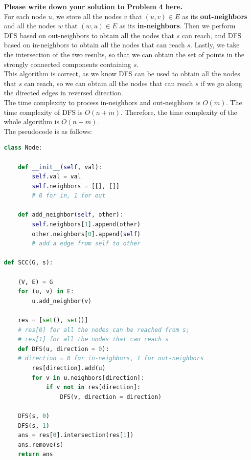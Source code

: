 \documentclass[11pt,twoside]{article}
\newenvironment{solution}{{\par\noindent\it Solution.}}{}
\begin{document}
\begin{solution}
\textbf{Please write down your solution to Problem 4 here.}
\vspace{10pt}\\
For each node $u$, we store all the nodes $v$ that $(u,v)\in E$ as its \textbf{out-neighbors} and all the nodes $w$ that $(w,u)\in E$ as its \textbf{in-neighbors}.
Then we perform DFS based on out-neighbors to obtain all the nodes that $s$ can reach, and DFS based on in-neighbors to obtain all the nodes that can reach $s$.
Lastly, we take the intersection of the two results, so that we can obtain the set of points in the strongly connected components containing $s$.
\vspace{10pt}\\
This algorithm is correct, as we know DFS can be used to obtain all the nodes that $s$ can reach,
so we can obtain all the nodes that can reach $s$ if we go along the directed edges in reversed direction. 
\vspace{10pt}\\
The time complexity to process in-neighbors and out-neighbors is $O(m)$. The time complexity of DFS is $O(n+m)$. Therefore, the time complexity of the whole algorithm is $O(n+m)$.
\vspace{10pt}\\
The pseudocode is as follows:
\begin{lstlisting}[language=Python]
class Node:

    def __init__(self, val):
        self.val = val
        self.neighbors = [[], []]
        # 0 for in, 1 for out

    def add_neighbor(self, other):
        self.neighbors[1].append(other)
        other.neighbors[0].append(self)
        # add a edge from self to other

def SCC(G, s):

    (V, E) = G
    for (u, v) in E:
        u.add_neighbor(v)
    
    res = [set(), set()]
    # res[0] for all the nodes can be reached from s;
    # res[1] for all the nodes that can reach s
    def DFS(u, direction = 0):
    # direction = 0 for in-neighbors, 1 for out-neighbors
        res[direction].add(u)
        for v in u.neighbors[direction]:
            if v not in res[direction]:
                DFS(v, direction = direction)
    
    DFS(s, 0)
    DFS(s, 1)
    ans = res[0].intersection(res[1])
    ans.remove(s)
    return ans
\end{lstlisting}
\end{solution}
\end{document}
